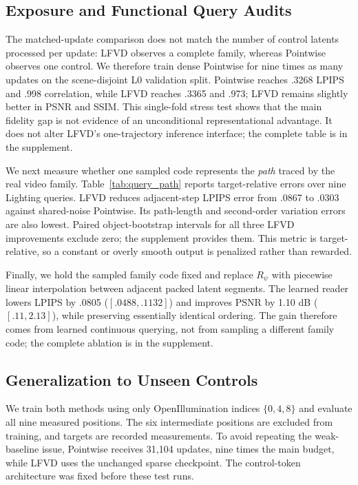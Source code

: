 \subsection{Exposure and Functional Query Audits}
\label{sec:function_audits}

The matched-update comparison does not match the number of control latents
processed per update: LFVD observes a complete family, whereas Pointwise
observes one control. We therefore train dense Pointwise for nine times as
many updates on the scene-disjoint L0 validation split. Pointwise reaches
.3268 LPIPS and .998 correlation, while LFVD reaches .3365 and .973; LFVD
remains slightly better in PSNR and SSIM. This single-fold stress test shows
that the main fidelity gap is not evidence of an unconditional
representational advantage. It does not alter LFVD's one-trajectory inference
interface; the complete table is in the supplement.

We next measure whether one sampled code represents the \emph{path} traced by
the real video family. Table~\ref{tab:query_path} reports target-relative
errors over nine Lighting queries. LFVD reduces adjacent-step LPIPS error from
.0867 to .0303 against shared-noise Pointwise. Its path-length and second-order
variation errors are also lowest. Paired object-bootstrap intervals for all
three LFVD improvements exclude zero; the supplement provides them. This
metric is target-relative, so a constant or overly smooth output is penalized
rather than rewarded.



Finally, we hold the sampled family code fixed and replace $R_\psi$ with
piecewise linear interpolation between adjacent packed latent segments. The
learned reader lowers LPIPS by .0805 ($[.0488,.1132]$) and improves PSNR by
1.10 dB ($[.11,2.13]$), while preserving essentially identical ordering.
The gain therefore comes from learned continuous querying, not from sampling
a different family code; the complete ablation is in the supplement.

\subsection{Generalization to Unseen Controls}
\label{sec:sparse_control}

We train both methods using only OpenIllumination indices $\{0,4,8\}$ and
evaluate all nine measured positions. The six intermediate positions are
excluded from training, and targets are recorded measurements. To avoid
repeating the weak-baseline issue, Pointwise receives 31,104 updates, nine
times the main budget, while LFVD uses the unchanged sparse checkpoint.
The control-token architecture was fixed before these test runs.

